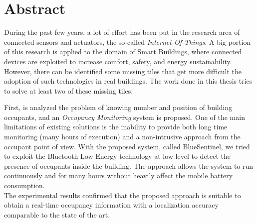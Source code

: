 %
%
\cleardoublepage
%
%
%
\begingroup
\let\cleardoublepage\relax
\let\cleardoublepage\relax
%
\chapter*{Abstract}
%
During the past few years, a lot of effort has been put in the research area of connected sensors and actuators, the so-called \emph{Internet-Of-Things}. A big portion of this research is applied to the domain of Smart Buildings, where connected devices are exploited to increase comfort, safety, and energy sustainability.
However, there can be identified some missing tiles that get more difficult the adoption of such technologies in real buildings.
The work done in this thesis tries to solve at least two of these missing tiles.

First, is analyzed the problem of knowing number and position of building occupants, and an \emph{Occupancy Monitoring} system is proposed. One of the main limitations of existing solutions is the inability to provide both long time monitoring (many hours of execution) and a non-intrusive approach from the occupant point of view.
With the proposed system, called BlueSentinel, we tried to exploit the Bluetooth Low Energy technology at low level to detect the presence of occupants inside the building. The approach allows the system to run continuously and for many hours without heavily affect the mobile battery consumption.\\
The experimental results confirmed that the proposed approach is suitable to obtain a real-time occupancy information with a localization accuracy comparable to the state of the art.

